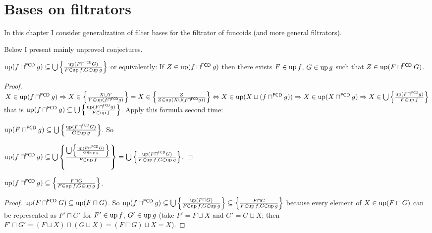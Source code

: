 \chapter{Bases on filtrators}

In this chapter I consider generalization of filter bases
for the filtrator of funcoids (and more general filtrators).

Below I present mainly unproved conjectures.

\begin{lem}
$\operatorname{up} (f \sqcap^{\mathsf{FCD}} g) \subseteq \bigcup \left\{ \frac{
\operatorname{up} (F \sqcap^{\mathsf{FCD}} G) }{ F \in \operatorname{up} f, G \in \operatorname{up} g }\right\}$
or equivalently: If $Z\in\operatorname{up} (f \sqcap^{\mathsf{FCD}} g)$ then there exists
$F \in \operatorname{up} f$, $G \in \operatorname{up} g$ such that $Z\in\operatorname{up} (F \sqcap^{\mathsf{FCD}} G)$.
\end{lem}

\begin{proof}
$X \in \operatorname{up} (f \sqcap^{\mathsf{FCD}} g) \Rightarrow X \in \left\{ \frac{
X \sqcup Y }{ Y \in \operatorname{up} (f
\sqcap^{\mathsf{FCD}} g) }\right\} = X \in \left\{ \frac{ Z }{ Z \in \operatorname{up} (X \sqcup (f \sqcap^{\mathsf{FCD}} g))
}\right\} \Leftrightarrow X \in \operatorname{up} (X \sqcup (f
\sqcap^{\mathsf{FCD}} g)) \Rightarrow X \in \operatorname{up} (X
\sqcap^{\mathsf{FCD}} g) \Rightarrow X \in \bigcup \left\{ \frac{ \operatorname{up} (F
\sqcap^{\mathsf{FCD}} g) }{ F \in \operatorname{up} f
}\right\}$ that is $\operatorname{up} (f \sqcap^{\mathsf{FCD}} g) \subseteq
\bigcup \left\{ \frac{ \operatorname{up} (F \sqcap^{\mathsf{FCD}} g) }{
F \in \operatorname{up} f }\right\}$. Apply this formula second time:

$\operatorname{up} (F \sqcap^{\mathsf{FCD}} g) \subseteq \bigcup \left\{ \frac{
\operatorname{up} (F \sqcap^{\mathsf{FCD}} G) }{ G \in
\operatorname{up} g }\right\}$. So

$\operatorname{up} (f \sqcap^{\mathsf{FCD}} g) \subseteq \bigcup \left\{ \frac{
\bigcup \left\{ \frac{ \operatorname{up} (F \sqcap^{\mathsf{FCD}} G) }{ G \in \operatorname{up} g }\right\} }{ F \in
\operatorname{up} f }\right\} = \bigcup \left\{ \frac{ \operatorname{up} (F
\sqcap^{\mathsf{FCD}} G) }{ F \in \operatorname{up} f,
G \in \operatorname{up} g }\right\}$.
\end{proof}

\begin{prop}
$\operatorname{up} (f \sqcap^{\mathsf{FCD}} g) \subseteq \left\{ \frac{ F \sqcap G }{ F \in \operatorname{up} f, G \in \operatorname{up} g }\right\}$.
\end{prop}

\begin{proof}
$\operatorname{up} (F \sqcap^{\mathsf{FCD}} G) \subseteq \operatorname{up} (F
\sqcap G)$. So $\operatorname{up} (f \sqcap^{\mathsf{FCD}} g) \subseteq \bigcup
\left\{ \frac{ \operatorname{up} (F \sqcap G) }{ F \in \operatorname{up} f,
G \in \operatorname{up} g }\right\} \subseteq \left\{ \frac{ F \sqcap G }{ F \in \operatorname{up} f, G \in \operatorname{up} g }\right\}$ because every
element of $X \in \operatorname{up} (F \sqcap G)$ can be represented as $F' \sqcap G'$
for $F' \in \operatorname{up} f$, $G' \in \operatorname{up} g$ (take $F' = F \sqcup X$ and $G'
= G \sqcup X$; then $F' \sqcap G' = (F \sqcup X) \sqcap (G \sqcup X) = (F
\sqcap G) \sqcup X = X$).
\end{proof}

